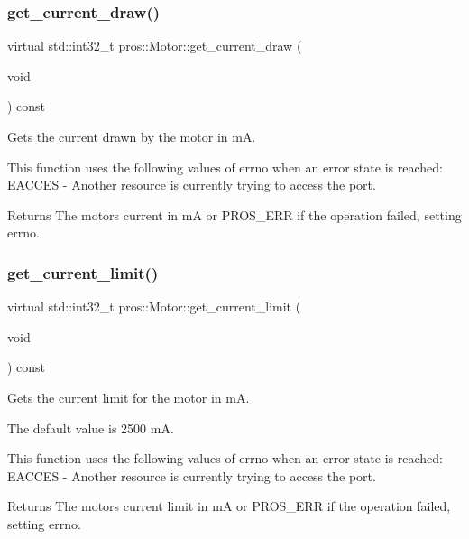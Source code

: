 \subsubsection{\texorpdfstring{get\_current\_draw()}{get\_current\_draw()}}
{\footnotesize\ttfamily virtual std\+::int32\+\_\+t pros\+::\+Motor\+::get\+\_\+current\+\_\+draw (\begin{DoxyParamCaption}\item[{void}]{ }\end{DoxyParamCaption}) const\hspace{0.3cm}{\ttfamily [virtual]}}



Gets the current drawn by the motor in mA. 

This function uses the following values of errno when an error state is reached\+: E\+A\+C\+C\+ES -\/ Another resource is currently trying to access the port.

\begin{DoxyReturn}{Returns}
The motor\textquotesingle{}s current in mA or P\+R\+O\+S\+\_\+\+E\+RR if the operation failed, setting errno. 
\end{DoxyReturn}
\mbox{\label{classpros_1_1Motor_ad2eafcdf16ed480ddcbb80a45b19c01a}} 
\subsubsection{\texorpdfstring{get\_current\_limit()}{get\_current\_limit()}}
{\footnotesize\ttfamily virtual std\+::int32\+\_\+t pros\+::\+Motor\+::get\+\_\+current\+\_\+limit (\begin{DoxyParamCaption}\item[{void}]{ }\end{DoxyParamCaption}) const\hspace{0.3cm}{\ttfamily [virtual]}}



Gets the current limit for the motor in mA. 

The default value is 2500 mA.

This function uses the following values of errno when an error state is reached\+: E\+A\+C\+C\+ES -\/ Another resource is currently trying to access the port.

\begin{DoxyReturn}{Returns}
The motor\textquotesingle{}s current limit in mA or P\+R\+O\+S\+\_\+\+E\+RR if the operation failed, setting errno. 
\end{DoxyReturn}
\mbox{\label{classpros_1_1Motor_acea42a96da651f72f138ea268c76217f}} 
